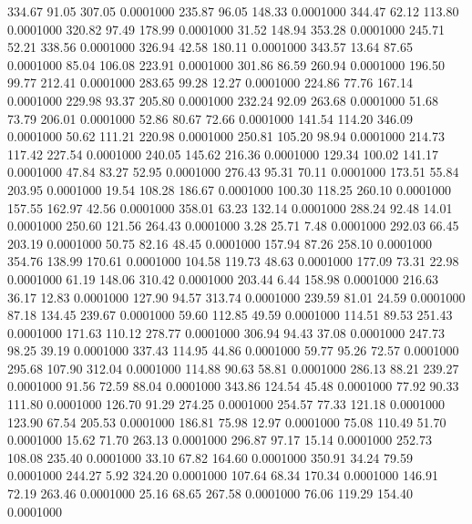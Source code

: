  334.67   91.05  307.05   0.0001000
 235.87   96.05  148.33   0.0001000
 344.47   62.12  113.80   0.0001000
 320.82   97.49  178.99   0.0001000
  31.52  148.94  353.28   0.0001000
 245.71   52.21  338.56   0.0001000
 326.94   42.58  180.11   0.0001000
 343.57   13.64   87.65   0.0001000
  85.04  106.08  223.91   0.0001000
 301.86   86.59  260.94   0.0001000
 196.50   99.77  212.41   0.0001000
 283.65   99.28   12.27   0.0001000
 224.86   77.76  167.14   0.0001000
 229.98   93.37  205.80   0.0001000
 232.24   92.09  263.68   0.0001000
  51.68   73.79  206.01   0.0001000
  52.86   80.67   72.66   0.0001000
 141.54  114.20  346.09   0.0001000
  50.62  111.21  220.98   0.0001000
 250.81  105.20   98.94   0.0001000
 214.73  117.42  227.54   0.0001000
 240.05  145.62  216.36   0.0001000
 129.34  100.02  141.17   0.0001000
  47.84   83.27   52.95   0.0001000
 276.43   95.31   70.11   0.0001000
 173.51   55.84  203.95   0.0001000
  19.54  108.28  186.67   0.0001000
 100.30  118.25  260.10   0.0001000
 157.55  162.97   42.56   0.0001000
 358.01   63.23  132.14   0.0001000
 288.24   92.48   14.01   0.0001000
 250.60  121.56  264.43   0.0001000
   3.28   25.71    7.48   0.0001000
 292.03   66.45  203.19   0.0001000
  50.75   82.16   48.45   0.0001000
 157.94   87.26  258.10   0.0001000
 354.76  138.99  170.61   0.0001000
 104.58  119.73   48.63   0.0001000
 177.09   73.31   22.98   0.0001000
  61.19  148.06  310.42   0.0001000
 203.44    6.44  158.98   0.0001000
 216.63   36.17   12.83   0.0001000
 127.90   94.57  313.74   0.0001000
 239.59   81.01   24.59   0.0001000
  87.18  134.45  239.67   0.0001000
  59.60  112.85   49.59   0.0001000
 114.51   89.53  251.43   0.0001000
 171.63  110.12  278.77   0.0001000
 306.94   94.43   37.08   0.0001000
 247.73   98.25   39.19   0.0001000
 337.43  114.95   44.86   0.0001000
  59.77   95.26   72.57   0.0001000
 295.68  107.90  312.04   0.0001000
 114.88   90.63   58.81   0.0001000
 286.13   88.21  239.27   0.0001000
  91.56   72.59   88.04   0.0001000
 343.86  124.54   45.48   0.0001000
  77.92   90.33  111.80   0.0001000
 126.70   91.29  274.25   0.0001000
 254.57   77.33  121.18   0.0001000
 123.90   67.54  205.53   0.0001000
 186.81   75.98   12.97   0.0001000
  75.08  110.49   51.70   0.0001000
  15.62   71.70  263.13   0.0001000
 296.87   97.17   15.14   0.0001000
 252.73  108.08  235.40   0.0001000
  33.10   67.82  164.60   0.0001000
 350.91   34.24   79.59   0.0001000
 244.27    5.92  324.20   0.0001000
 107.64   68.34  170.34   0.0001000
 146.91   72.19  263.46   0.0001000
  25.16   68.65  267.58   0.0001000
  76.06  119.29  154.40   0.0001000
